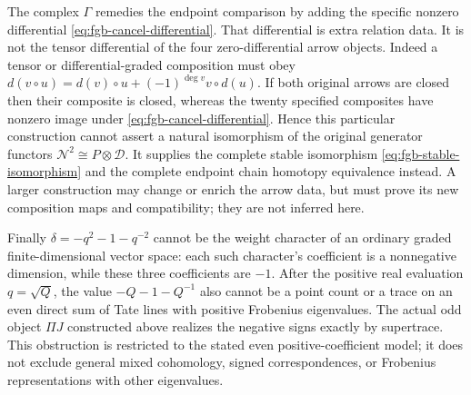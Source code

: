 The complex $\Gamma$ remedies the endpoint comparison by adding the
specific nonzero differential \eqref{eq:fgb-cancel-differential}.
That differential is extra relation data. It is not the tensor
differential of the four zero-differential arrow objects. Indeed a
tensor or differential-graded composition must obey
$d(v\circ u)=d(v)\circ u+(-1)^{\deg v}v\circ d(u)$.
If both original arrows are closed then their composite is closed,
whereas the twenty specified composites have nonzero image under
\eqref{eq:fgb-cancel-differential}. Hence this particular construction
cannot assert a natural isomorphism of the original generator functors
$\mathcal N^2\cong P\otimes\mathcal D$. It supplies the complete
stable isomorphism \eqref{eq:fgb-stable-isomorphism} and the complete
endpoint chain homotopy equivalence instead. A larger construction may
change or enrich the arrow data, but must prove its new composition
maps and compatibility; they are not inferred here.

Finally $\delta=-q^2-1-q^{-2}$ cannot be the weight character of an
ordinary graded finite-dimensional vector space: each such character's
coefficient is a nonnegative dimension, while these three coefficients
are $-1$. After the positive real evaluation $q=\sqrt Q$, the value
$-Q-1-Q^{-1}$ also cannot be a point count or a trace on an even direct
sum of Tate lines with positive Frobenius eigenvalues. The actual
odd object $\Pi J$ constructed above realizes the negative signs
exactly by supertrace. This obstruction is restricted to the stated
even positive-coefficient model; it does not exclude general mixed
cohomology, signed correspondences, or Frobenius representations with
other eigenvalues.
